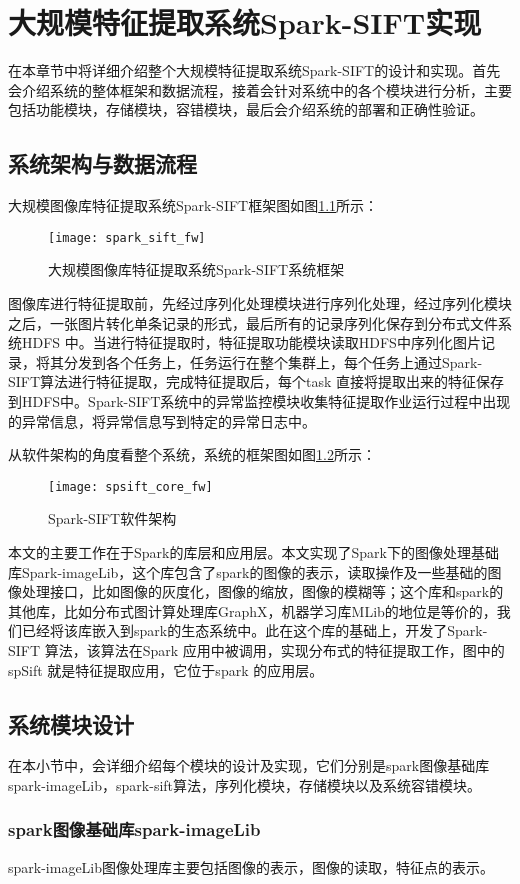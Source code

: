 ﻿\chapter{大规模特征提取系统Spark-SIFT实现}
在本章节中将详细介绍整个大规模特征提取系统Spark-SIFT的设计和实现。首先会介绍系统的整体框架和数据流程，接着会针对系统中的各个模块进行分析，主要包括功能模块，存储模块，容错模块，最后会介绍系统的部署和正确性验证。

\section{系统架构与数据流程}
大规模图像库特征提取系统Spark-SIFT框架图如图\ref{fig:spark_sift_fw}所示：
\begin{figure}[htp]
\centering
\texttt{[image: spark\_sift\_fw]}
\caption{大规模图像库特征提取系统Spark-SIFT系统框架}
\label{fig:spark_sift_fw}
\end{figure}
图像库进行特征提取前，先经过序列化处理模块进行序列化处理，经过序列化模块之后，一张图片转化单条记录的形式，最后所有的记录序列化保存到分布式文件系统HDFS 中。当进行特征提取时，特征提取功能模块读取HDFS中序列化图片记录，将其分发到各个任务上，任务运行在整个集群上，每个任务上通过Spark-SIFT算法进行特征提取，完成特征提取后，每个task 直接将提取出来的特征保存到HDFS中。Spark-SIFT系统中的异常监控模块收集特征提取作业运行过程中出现的异常信息，将异常信息写到特定的异常日志中。

从软件架构的角度看整个系统，系统的框架图如图\ref{fig:spsift_core_fw}所示：
\begin{figure}[htp]
\centering
\texttt{[image: spsift\_core\_fw]}
\caption{Spark-SIFT软件架构}
\label{fig:spsift_core_fw}
\end{figure}
本文的主要工作在于Spark的库层和应用层。本文实现了Spark下的图像处理基础库Spark-imageLib，这个库包含了spark的图像的表示，读取操作及一些基础的图像处理接口，比如图像的灰度化，图像的缩放，图像的模糊等；这个库和spark的其他库，比如分布式图计算处理库GraphX，机器学习库MLib的地位是等价的，我们已经将该库嵌入到spark的生态系统中。此在这个库的基础上，开发了Spark-SIFT 算法，该算法在Spark 应用中被调用，实现分布式的特征提取工作，图中的spSift 就是特征提取应用，它位于spark 的应用层。
\section{系统模块设计}
在本小节中，会详细介绍每个模块的设计及实现，它们分别是spark图像基础库spark-imageLib，spark-sift算法，序列化模块，存储模块以及系统容错模块。
\subsection{spark图像基础库spark-imageLib}
spark-imageLib图像处理库主要包括图像的表示，图像的读取，特征点的表示。
